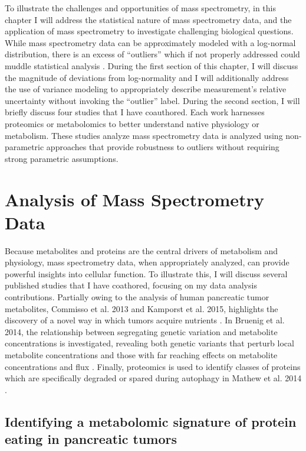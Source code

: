 To illustrate the challenges and opportunities of mass spectrometry, in this chapter I will address the statistical nature of mass spectrometry data, and the application of mass spectrometry to investigate challenging biological questions.  While mass spectrometry data can be approximately modeled with a log-normal distribution, there is an excess of ``outliers'' which if not properly addressed could muddle statistical analysis \cite{Nesvizhskii:2005jp, Cox:2008ir}. During the first section of this chapter, I will discuss the magnitude of deviations from log-normality and I will additionally address the use of variance modeling to appropriately describe measurement's relative uncertainty without invoking the ``outlier'' label.  During the second section, I will briefly discuss four studies that I have coauthored. Each work harnesses proteomics or metabolomics to better understand native physiology or metabolism. These studies analyze mass spectrometry data is analyzed using non-parametric approaches that provide robustness to outliers without requiring strong parametric assumptions.




\section{Analysis of Mass Spectrometry Data}

Because metabolites and proteins are the central drivers of metabolism and physiology, mass spectrometry data, when appropriately analyzed, can provide powerful insights into cellular function.  To illustrate this, I will discuss several published studies that I have coathored, focusing on my data analysis contributions. Partially owing to the analysis of human pancreatic tumor metabolites, Commisso et al. 2013 and Kamporst et al. 2015, highlights the discovery of a novel way in which tumors acquire nutrients \cite{Commisso:2013hz, Kamphorst:2015cc}.  In Bruenig et al. 2014, the relationship between segregating genetic variation and metabolite concentrations is investigated, revealing both genetic variants that perturb local metabolite concentrations and those with far reaching effects on metabolite concentrations and flux \cite{Breunig:2014bu}.  Finally, proteomics is used to identify classes of proteins which are specifically degraded or spared during autophagy in Mathew et al. 2014 \cite{Mathew:2014hz}.

\subsection{Identifying a metabolomic signature of protein eating in pancreatic tumors}

